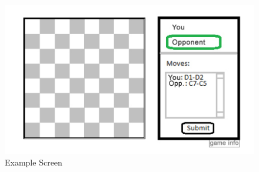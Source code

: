 \begin{figure}[H]
   \centering
   \includegraphics[scale=1.0]{screenshot6.jpg}
   \caption{Example Screen}
  \end{figure}

